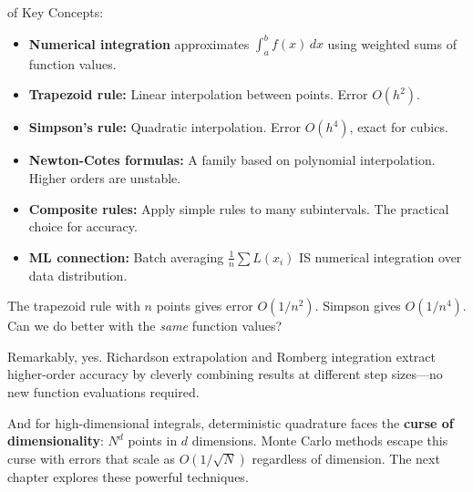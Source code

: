 of Key Concepts:
\begin{itemize}
    \item \textbf{Numerical integration} approximates $\int_a^b f(x)\,dx$ using weighted sums of function values.
    \item \textbf{Trapezoid rule:} Linear interpolation between points. Error $O(h^2)$.
    \item \textbf{Simpson's rule:} Quadratic interpolation. Error $O(h^4)$, exact for cubics.
    \item \textbf{Newton-Cotes formulas:} A family based on polynomial interpolation. Higher orders are unstable.
    \item \textbf{Composite rules:} Apply simple rules to many subintervals. The practical choice for accuracy.
    \item \textbf{ML connection:} Batch averaging $\frac{1}{n}\sum L(x_i)$ IS numerical integration over data distribution.
\end{itemize}



 The trapezoid rule with $n$ points gives error $O(1/n^2)$. Simpson gives $O(1/n^4)$. Can we do better with the \emph{same} function values?

Remarkably, yes. Richardson extrapolation and Romberg integration extract higher-order accuracy by cleverly combining results at different step sizes---no new function evaluations required.

And for high-dimensional integrals, deterministic quadrature faces the \textbf{curse of dimensionality}: $N^d$ points in $d$ dimensions. Monte Carlo methods escape this curse with errors that scale as $O(1/\sqrt{N})$ regardless of dimension. The next chapter explores these powerful techniques.



